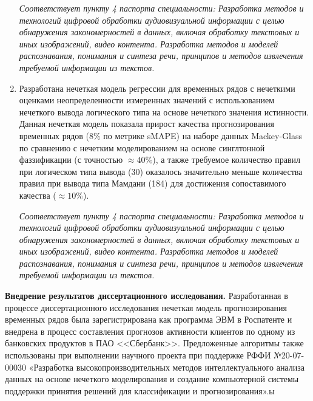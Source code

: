 \begin{enumerate}[beginpenalty=10000]
  \textit{Соответствует пункту 4 паспорта специальности: Разработка методов и технологий цифровой обработки аудиовизуальной информации с целью обнаружения закономерностей в данных, включая обработку текстовых и иных изображений, видео контента. Разработка методов и моделей распознавания, понимания и синтеза речи, принципов и методов извлечения требуемой информации из текстов.}
  \item Разработана нечеткая модель регрессии для временных рядов с нечеткими оценками неопределенности измеренных значений с использованием нечеткого вывода логического типа на основе нечеткого значения истинности. Данная нечеткая модель показала прирост качества прогнозирования временных рядов ($8\%$ по метрике sMAPE) на наборе данных Mackey-Glass по сравнению с нечетким моделированием на основе синглтонной фаззификации (с точностью $\approx 40\%$), а также требуемое количество правил при логическом типа вывода (30) оказалось значительно меньше количества правил при вывода типа Мамдани (184) для достижения сопоставимого качества ($\approx 10\%$).
 
  \textit{Соответствует пункту 4 паспорта специальности: Разработка методов и технологий цифровой обработки аудиовизуальной информации с целью обнаружения закономерностей в данных, включая обработку текстовых и иных изображений, видео контента. Разработка методов и моделей распознавания, понимания и синтеза речи, принципов и методов извлечения требуемой информации из текстов.}
  
\end{enumerate}


\textbf{Внедрение результатов диссертационного исследования.} Разработанная в процессе диссертационного исследования нечеткая модель прогнозирования временных рядов была зарегистрирована как программа ЭВМ в Роспатенте и внедрена в процесс составления прогнозов активности клиентов по одному из банковских продуктов в ПАО <<Сбербанк>>. Предложенные алгоритмы также использованы при выполнении научного проек­та при поддержке РФФИ №20-07-00030 «Разработка высокопроизводительных методов интеллектуального анализа данных на основе нечеткого моделиро­вания и создание компьютерной системы поддержки принятия решений для классификации и прогнозирования».ы


